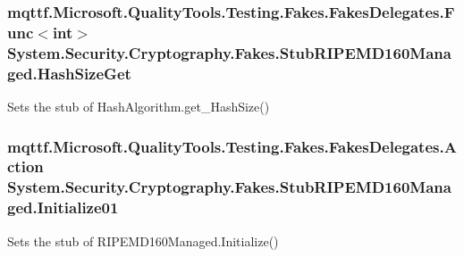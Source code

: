 \hypertarget{class_system_1_1_security_1_1_cryptography_1_1_fakes_1_1_stub_r_i_p_e_m_d160_managed_a37d4d1ae5232488d9355cd7354f3b572}{
\subsubsection[{Hash\-Size\-Get}]{\setlength{\rightskip}{0pt plus 5cm}mqttf.\-Microsoft.\-Quality\-Tools.\-Testing.\-Fakes.\-Fakes\-Delegates.\-Func$<$int$>$ System.\-Security.\-Cryptography.\-Fakes.\-Stub\-R\-I\-P\-E\-M\-D160\-Managed.\-Hash\-Size\-Get}}\label{class_system_1_1_security_1_1_cryptography_1_1_fakes_1_1_stub_r_i_p_e_m_d160_managed_a37d4d1ae5232488d9355cd7354f3b572}


Sets the stub of Hash\-Algorithm.\-get\-\_\-\-Hash\-Size()

\hypertarget{class_system_1_1_security_1_1_cryptography_1_1_fakes_1_1_stub_r_i_p_e_m_d160_managed_af70be2bcf6396790d1dbc55bd8aef823}{
\subsubsection[{Initialize01}]{\setlength{\rightskip}{0pt plus 5cm}mqttf.\-Microsoft.\-Quality\-Tools.\-Testing.\-Fakes.\-Fakes\-Delegates.\-Action System.\-Security.\-Cryptography.\-Fakes.\-Stub\-R\-I\-P\-E\-M\-D160\-Managed.\-Initialize01}}\label{class_system_1_1_security_1_1_cryptography_1_1_fakes_1_1_stub_r_i_p_e_m_d160_managed_af70be2bcf6396790d1dbc55bd8aef823}


Sets the stub of R\-I\-P\-E\-M\-D160\-Managed.\-Initialize()

